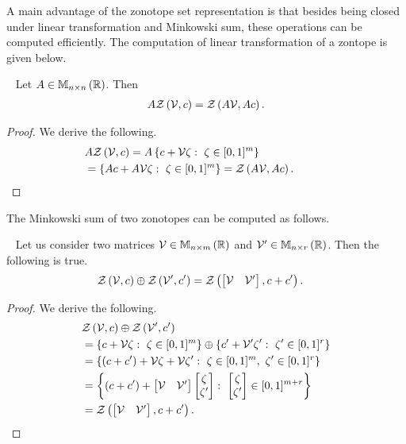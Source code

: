 A main advantage of the zonotope set representation is that besides
being closed under linear transformation and Minkowski sum, these
operations can be computed efficiently.  The computation of linear
transformation of a zontope is given below.
%
\begin{lemma}~\label{lem:lin-rz}
Let $A\in\mathbb{M}_{n\times n}\left(\mathbb{R}\right)$.  Then
%
\begin{align*}
A\mathit{\mathcal{Z}}\left(\mathcal{V},c\right)=\mathit{\mathcal{Z}}\left(A\mathcal{V},Ac\right).
\end{align*}
%
\end{lemma} 
%
\begin{proof}
We derive the following.
%
\begin{align*}
&
  A\mathit{\mathcal{Z}}\left(\mathcal{V},c\right)=A\left\{c+\mathcal{V}\zeta:~\zeta\in[0,1]^m\right\}\\
& = \left\{Ac+A\mathcal{V}\zeta:~\zeta\in[0,1]^m\right\}=\mathit{\mathcal{Z}}\left(A\mathcal{V},Ac\right).\hspace{3em}\qedhere
\end{align*}
%
\end{proof}
%
The Minkowski sum of two zonotopes can be computed as follows.
%
\begin{lemma}~\label{lem:min-rz}
Let us consider two matrices $\mathcal{V}\in\mathbb{M}_{n\times m}\left(\mathbb{R}\right)$ and
$\mathcal{V}^\prime\in\mathbb{M}_{n\times r}\left(\mathbb{R}\right)$.  Then the following is true.
%
\begin{align*}
& \mathit{\mathcal{Z}}\left(\mathcal{V},c\right)\oplus\mathit{\mathcal{Z}}\left(\mathcal{V}^\prime,c^\prime\right)
= \mathit{\mathcal{Z}}\left(\left[\begin{matrix}\mathcal{V} & \mathcal{V}^\prime\end{matrix}\right],c+c^\prime\right).  
\end{align*}
%
\end{lemma}
%
\begin{proof}
We derive the following.
%
\begin{align*}
& \mathit{\mathcal{Z}}\left(\mathcal{V},c\right)\oplus\mathit{\mathcal{Z}}\left(\mathcal{V}^\prime,c^\prime\right)\\
& = \left\{c+\mathcal{V}\zeta:~\zeta\in[0,1]^m\right\}\oplus\left\{c^\prime+\mathcal{V}^\prime\zeta^\prime:~\zeta^\prime\in[0,1]^r\right\}\\
& =
  \left\{\left(c+c^\prime\right)+\mathcal{V}\zeta+\mathcal{V}\zeta^\prime:~\zeta\in[0,1]^m,~\zeta^\prime\in[0,1]^r\right\}\\
& = \left\{\left(c+c^\prime\right)+\left[\begin{matrix}\mathcal{V}
      &\mathcal{V}^\prime\end{matrix}\right]\left[\begin{matrix}\zeta\\\zeta^\prime\end{matrix}\right]:~{\left[\begin{matrix}\zeta\\\zeta^\prime\end{matrix}\right]}\in[0,1]^{m+r}\right\}\\
& =  \mathit{\mathcal{Z}}\left(\left[\begin{matrix}\mathcal{V} & \mathcal{V}^\prime\end{matrix}\right],c+c^\prime\right).\hspace{3em}\qedhere
\end{align*}
%
\end{proof}
